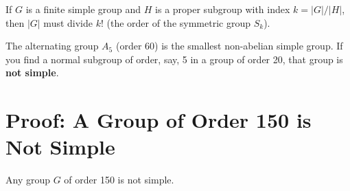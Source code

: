 \begin{theorem}
If $G$ is a finite simple group and $H$ is a proper subgroup with index $k = |G|/|H|$, then $|G|$ must divide $k!$ (the order of the symmetric group $S_k$).
\end{theorem}

\begin{example}
The alternating group $A_5$ (order 60) is the smallest non-abelian simple group. If you find a normal subgroup of order, say, 5 in a group of order 20, that group is \textbf{not simple}.
\end{example}

\section{Proof: A Group of Order 150 is Not Simple}

\begin{theorem}
Any group $G$ of order 150 is not simple.
\end{theorem}

